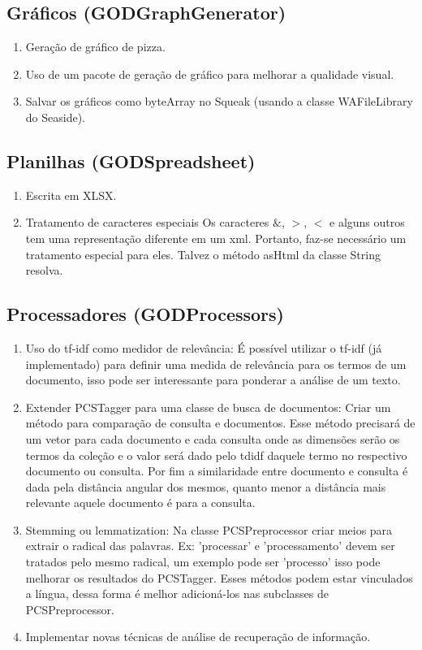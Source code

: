 \subsection{Gráficos (GODGraphGenerator)}
\begin{enumerate}
\item Geração de gráfico de pizza.
\item Uso de um pacote de geração de gráfico para melhorar a qualidade visual.
\item Salvar os gráficos como byteArray no Squeak (usando a classe WAFileLibrary do Seaside).
\end{enumerate}

\subsection{Planilhas (GODSpreadsheet)}
\begin{enumerate}
\item Escrita em XLSX.
\item Tratamento de caracteres especiais Os caracteres $\&$, $>$, $<$ e alguns outros tem uma representação diferente em um xml. Portanto, faz-se necessário um tratamento especial para eles. Talvez o método asHtml da classe String resolva.
\end{enumerate}

\subsection{Processadores (GODProcessors)}
\begin{enumerate}
\item Uso do tf-idf como medidor de relevância: É possível utilizar o tf-idf (já implementado) para definir uma medida de relevância para os termos de um documento, isso pode ser interessante para ponderar a análise de um texto.
\item Extender PCSTagger para uma classe de busca de documentos: Criar um método para comparação de consulta e documentos. Esse método precisará de um vetor para cada documento e cada consulta onde as dimensões serão os termos da coleção e o valor será dado pelo tdidf daquele termo no respectivo documento ou consulta. Por fim a similaridade entre documento e consulta é dada pela distância angular dos mesmos, quanto menor a distância mais relevante aquele documento é para a consulta.
\item Stemming ou lemmatization: Na classe PCSPreprocessor criar meios para extrair o radical das palavras. Ex: 'processar' e 'processamento' devem ser tratados pelo mesmo radical, um exemplo pode ser 'processo' isso pode melhorar os resultados do PCSTagger. Esses métodos podem estar vinculados a língua, dessa forma é melhor adicioná-los nas subclasses de PCSPreprocessor.
\item Implementar novas técnicas de análise de recuperação de informação.
\end{enumerate}

